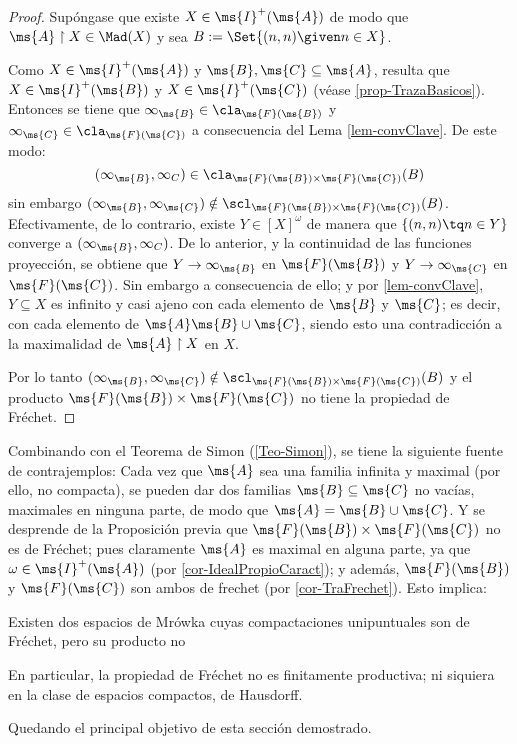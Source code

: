 	\begin{proof} 
		Supóngase que existe $X \in\ms{I}^+(\ms{A})$ de modo que $\ms{A} \upharpoonright X \in \Mad(X)$ y sea $B:=\Set{ (n,n) \given n \in X }$.

		Como $X \in \ms{I}^+(\ms{A})$ y $\ms{B},\ms{C} \subseteq \ms{A}$, resulta que $X \in \ms{I}^+(\ms{B})$ y $X \in \ms{I}^+(\ms{C})$ (véase \ref{prop-TrazaBasicos}). Entonces se tiene que $\infty_\ms{B} \in \cla_{\ms{F}(\ms{B})}$ y $\infty_\ms{C} \in \cla_{\ms{F}(\ms{C})}$ a consecuencia del Lema \ref{lem-convClave}. De este modo:
		$$ (\infty_\ms{B},\infty_C) \in \cla_{\ms{F}(\ms{B}) \times \ms{F}(\ms{C})}(B) $$
		sin embargo $(\infty_\ms{B},\infty_\ms{C}) \notin \scl_{\ms{F}(\ms{B}) \times \ms{F}(\ms{C})}(B)$. Efectivamente, de lo contrario, existe $Y \in [X]^\omega$ de manera que $\{(n,n) \tq n \in Y\}$ converge a $ (\infty_\ms{B},\infty_C)$. De lo anterior, y la continuidad de las funciones proyección, se obtiene que $Y \to \infty_\ms{B}$ en $\ms{F}(\ms{B})$ y $Y \to \infty_\ms{C}$ en $\ms{F}(\ms{C})$. Sin embargo a consecuencia de ello; y por \ref{lem-convClave}, $Y \subseteq X$ es infinito y casi ajeno con cada elemento de $\ms{B}$ y $\ms{C}$; es decir, con cada elemento de $\ms{A}\ms{B} \cup \ms{C}$, siendo esto una contradicción a la maximalidad de $\ms{A} \upharpoonright X$ en $X$.

		Por lo tanto $(\infty_\ms{B},\infty_\ms{C}) \notin \scl_{\ms{F}(\ms{B}) \times \ms{F}(\ms{C})}(B)$ y el producto $\ms{F}(\ms{B}) \times \ms{F}(\ms{C})$ no tiene la propiedad de Fréchet.
	\end{proof}
	
	Combinando con el Teorema de Simon (\ref{Teo-Simon}), se tiene la siguiente fuente de contrajemplos: Cada vez que $\ms{A}$ sea una familia infinita y maximal (por ello, no compacta), se pueden dar dos familias $\ms{B} \subseteq \ms{C}$ no vacías, maximales en ninguna parte, de modo que $\ms{A}=\ms{B} \cup \ms{C}$. Y se desprende de la Proposición previa que $\ms{F}(\ms{B}) \times \ms{F}(\ms{C})$ no es de Fréchet; pues claramente $\ms{A}$ es maximal en alguna parte, ya que $\omega \in \ms{I}^+(\ms{A})$ (por \ref{cor-IdealPropioCaract}); y además, $\ms{F}(\ms{B})$ y $\ms{F}(\ms{C})$ son ambos de frechet (por \ref{cor-TraFrechet}). Esto implica:

	\begin{corolario}\label{cor-FrechNoProd}
		Existen dos espacios de Mrówka cuyas compactaciones unipuntuales son de Fréchet, pero su producto no

		En particular, la propiedad de Fréchet no es finitamente productiva; ni siquiera en la clase de espacios compactos, de Hausdorff.
	\end{corolario}

	Quedando el principal objetivo de esta sección demostrado.